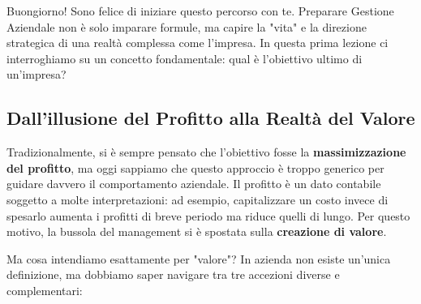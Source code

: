 \documentclass[a4paper,10pt]{article}
\begin{document}
Buongiorno! Sono felice di iniziare questo percorso con te. Preparare Gestione Aziendale non è solo imparare formule, ma capire la "vita" e la direzione strategica di una realtà complessa come l'impresa. In questa prima lezione ci interroghiamo su un concetto fondamentale: qual è l'obiettivo ultimo di un'impresa?

\subsection*{Dall'illusione del Profitto alla Realtà del Valore}

Tradizionalmente, si è sempre pensato che l'obiettivo fosse la \textbf{massimizzazione del profitto}, ma oggi sappiamo che questo approccio è troppo generico per guidare davvero il comportamento aziendale. Il profitto è un dato contabile soggetto a molte interpretazioni: ad esempio, capitalizzare un costo invece di spesarlo aumenta i profitti di breve periodo ma riduce quelli di lungo. Per questo motivo, la bussola del management si è spostata sulla \textbf{creazione di valore}.

Ma cosa intendiamo esattamente per "valore"? In azienda non esiste un'unica definizione, ma dobbiamo saper navigare tra tre accezioni diverse e complementari:

\begin{table}[H]
    \setlength{\extrarowheight}{12pt}
    \caption{Tipologie di valore d'impresa}
\end{table}
\end{document}
